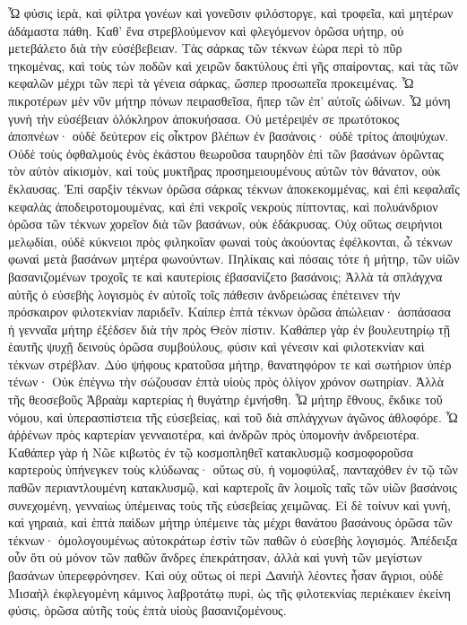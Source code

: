 Ὦ φύσις ἱερὰ, καὶ φίλτρα γονέων καὶ γονεῦσιν φιλόστοργε, καὶ τροφεῖα, καὶ μητέρων ἀδάμαστα πάθη. 
Καθ' ἕνα στρεβλούμενον καὶ φλεγόμενον ὁρῶσα υήτηρ, οὐ μετεβάλετο διὰ τὴν εὐσέβεβειαν. 
Τὰς σάρκας τῶν τέκνων ἑώρα περὶ τὸ πῦρ τηκομένας, καὶ τοὺς τὼν ποδῶν καὶ χειρῶν δακτύλους ἐπὶ γῆς σπαίροντας, καὶ τὰς τῶν κεφαλῶν μέχρι τῶν περὶ τὰ γένεια σάρκας, ὥσπερ προσωπεῖα προκειμένας. 
Ὦ πικροτέρων μὲν νῦν μήτηρ πόνων πειρασθεῖσα, ἤπερ τῶν ἐπ' αὐτοῖς ὠδίνων. 
Ὦ μόνη γυνὴ τὴν εὐσέβειαν ὁλόκληρον ἀποκυήσασα. 
Οὐ μετέρεψέν σε πρωτότοκος ἀποπνέων· οὐδὲ δεύτερον εἰς οἶκτρον βλέπων ἐν βασάνοις· οὐδὲ τρίτος ἀποψύχων. 
Οὐδὲ τοὺς ὀφθαλμοὺς ἑνὸς ἑκάστου θεωροῦσα ταυρηδὸν ἐπὶ τῶν βασάνων ὁρῶντας τὸν αὐτὸν αἰκισμὸν, καὶ τοὺς μυκτῆρας προσημειουμένους αὐτῶν τὸν θάνατον, οὐκ ἔκλαυσας. 
Ἐπὶ σαρξὶν τέκνων ὁρῶσα σάρκας τέκνων ἀποκεκομμένας, καὶ ἐπὶ κεφαλαῖς κεφαλὰς ἀποδειροτομουμένας, καὶ ἐπὶ νεκροῖς νεκροὺς πίπτοντας, καὶ πολυάνδριον ὁρῶσα τῶν τέκνων χορεῖον διὰ τῶν βασάνων, οὐκ ἐδάκρυσας. 
Οὐχ οὕτως σειρήνιοι μελῳδίαι, οὐδὲ κύκνειοι πρὸς φιληκοΐαν φωναὶ τοὺς ἀκούοντας ἐφέλκονται, ὦ τέκνων φωναὶ μετὰ βασάνων μητέρα φωνούντων. 
Πηλίκαις καὶ πόσαις τότε ἡ μήτηρ, τῶν υἱῶν βασανιζομένων τροχοῖς τε καὶ καυτερίοις ἐβασανίζετο βασάνοις; 
Ἀλλὰ τὰ σπλάγχνα αὐτῆς ὁ εὐσεβὴς λογισμὸς ἐν αὐτοῖς τοῖς πάθεσιν ἀνδρειώσας ἐπέτεινεν τὴν πρόσκαιρον φιλοτεκνίαν παριδεῖν. 
Καίπερ ἑπτὰ τέκνων ὁρῶσα ἀπώλειαν· ἀσπάσασα ἡ γενναῖα μήτηρ ἐξέδσεν διὰ τὴν πρὸς Θεὸν πίστιν. 
Καθάπερ γὰρ ἐν βουλευτηρίῳ τῇ ἑαυτῆς ψυχῇ δεινοὺς ὁρῶσα συμβούλους, φύσιν καὶ γένεσιν καὶ φιλοτεκνίαν καὶ τέκνων στρέβλαν. 
Δύο ψήφους κρατοῦσα μήτηρ, θανατηφόρον τε καὶ σωτήριον ὑπὲρ τένων· 
Οὐκ ἐπέγνω τὴν σώζουσαν ἑπτὰ υἱοὺς πρὸς ὀλίγον χρόνον σωτηρίαν. 
Ἀλλὰ τῆς θεοσεβοῦς Ἁβραὰμ καρτερίας ἡ θυγάτηρ ἐμνήσθη. 
Ὦ μήτηρ ἔθνους, ἔκδικε τοῦ νόμου, καὶ ὑπερασπίστεια τῆς εὐσεβείας, καὶ τοῦ διὰ σπλάγχνων ἀγῶνος ἀθλοφόρε. 
Ὦ ἀῤῥένων πρὸς καρτερίαν γενναιοτέρα, καὶ ἀνδρῶν πρὸς ὑπομονὴν ἀνδρειοτέρα. 
Καθάπερ γὰρ ἡ Νῶε κιβωτὸς ἐν τῷ κοσμοπληθεῖ κατακλυσμῷ κοσμοφοροῦσα καρτεροὺς ὑπήνεγκεν τοὺς κλύδωνας· 
οὕτως σὺ, ἡ νομοφύλαξ, πανταχόθεν ἐν τῷ τῶν παθῶν περιαντλουμένη κατακλυσμῷ, καὶ καρτεροῖς ἂν λοιμοῖς ταῖς τῶν υἱῶν βασάνοις συνεχομένη, γενναίως ὑπέμεινας τοὺς τῆς εὐσεβείας χειμῶνας. 
Εἰ δὲ τοίνυν καὶ γυνὴ, καὶ γηραιὰ, καὶ ἑπτὰ παὶδων μήτηρ ὑπέμεινε τὰς μέχρι θανάτου βασάνους ὁρῶσα τῶν τέκνων· ὁμολογουμένως αὐτοκράτωρ ἐστὶν τῶν παθῶν ὁ εὐσεβὴς λογισμός. 
Ἀπέδειξα οὖν ὅτι οὐ μόνον τῶν παθῶν ἄνδρες ἐπεκράτησαν, ἀλλὰ καὶ γυνὴ τῶν μεγίστων βασάνων ὑπερεφρόνησεν. 
Καὶ οὐχ οὕτως οἱ περὶ Δανιὴλ λέοντες ἦσαν ἄγριοι, οὐδὲ Μισαὴλ ἐκφλεγομένη κάμινος λαβροτάτῳ πυρὶ, ὡς τῆς φιλοτεκνίας περιέκαιεν ἐκείνη φύσις, ὁρῶσα αὑτῆς τοὺς ἑπτὰ υἱοὺς βασανιζομένους. 
